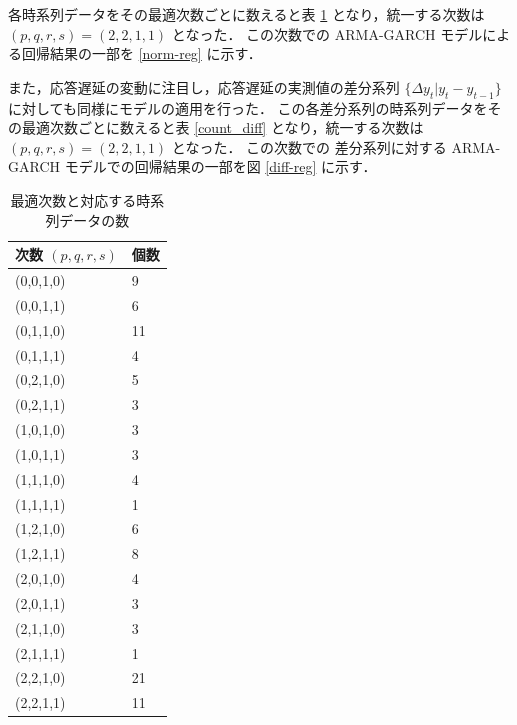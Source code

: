 \documentclass[a4j]{jarticle}
\begin{document}
各時系列データをその最適次数ごとに数えると表 \ref{count_norm} となり，統一する次数は $(p,q,r,s) = (2,2,1,1)$ となった．
この次数での ARMA-GARCH モデルによる回帰結果の一部を \ref{norm-reg} に示す．

また，応答遅延の変動に注目し，応答遅延の実測値の差分系列 $\{\Delta y_t | y_t - y_{t-1}\}$ に対しても同様にモデルの適用を行った．
この各差分系列の時系列データをその最適次数ごとに数えると表 \ref{count_diff} となり，統一する次数は $(p,q,r,s) = (2,2,1,1)$ となった．
この次数での 差分系列に対する ARMA-GARCH モデルでの回帰結果の一部を図 \ref{diff-reg} に示す．

\begin{table}[h]
\centering
\caption{最適次数と対応する時系列データの数}
\label{count_norm}
\begin{tabular}{|l|l|}
\hline
次数 $(p,q,r,s)$ & 個数\\
\hline
(0,0,1,0) & 9\\
\hline
(0,0,1,1) & 6\\
\hline
(0,1,1,0) & 11\\
\hline
(0,1,1,1) & 4\\
\hline
(0,2,1,0) & 5\\
\hline
(0,2,1,1) & 3\\
\hline
(1,0,1,0) & 3\\
\hline
(1,0,1,1) & 3\\
\hline
(1,1,1,0) & 4\\
\hline
(1,1,1,1) & 1\\
\hline
(1,2,1,0) & 6\\
\hline
(1,2,1,1) & 8\\
\hline
(2,0,1,0) & 4\\
\hline
(2,0,1,1) & 3\\
\hline
(2,1,1,0) & 3\\
\hline
(2,1,1,1) & 1\\
\hline
(2,2,1,0) & 21\\
\hline
(2,2,1,1) & 11\\
\hline
\end{tabular}
\end{table}
\end{document}
